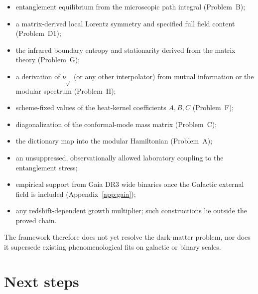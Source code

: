 \begin{itemize}
  \item entanglement equilibrium from the microscopic path integral
        (Problem~B);
  \item a matrix-derived local Lorentz symmetry and specified full
        field content (Problem~D1);
  \item the infrared boundary entropy and stationarity derived from
        the matrix theory (Problem~G);
  \item a derivation of \(\nu_{\sqrt{}}\) (or any other interpolator)
        from mutual information or the modular spectrum (Problem~H);
  \item scheme-fixed values of the heat-kernel coefficients
        \(A,B,C\) (Problem~F);
  \item diagonalization of the conformal-mode mass matrix
        (Problem~C);
  \item the dictionary map into the modular Hamiltonian
        (Problem~A);
  \item an unsuppressed, observationally allowed laboratory coupling
        to the entanglement stress;
  \item empirical support from Gaia DR3 wide binaries once the
        Galactic external field is included (Appendix~\ref{app:gaia});
  \item any redshift-dependent growth multiplier; such constructions
        lie outside the proved chain.
\end{itemize}
The framework therefore does not yet resolve the dark-matter problem,
nor does it supersede existing phenomenological fits on galactic or
binary scales.

\section{Next steps}
\label{sec:concl-next}

